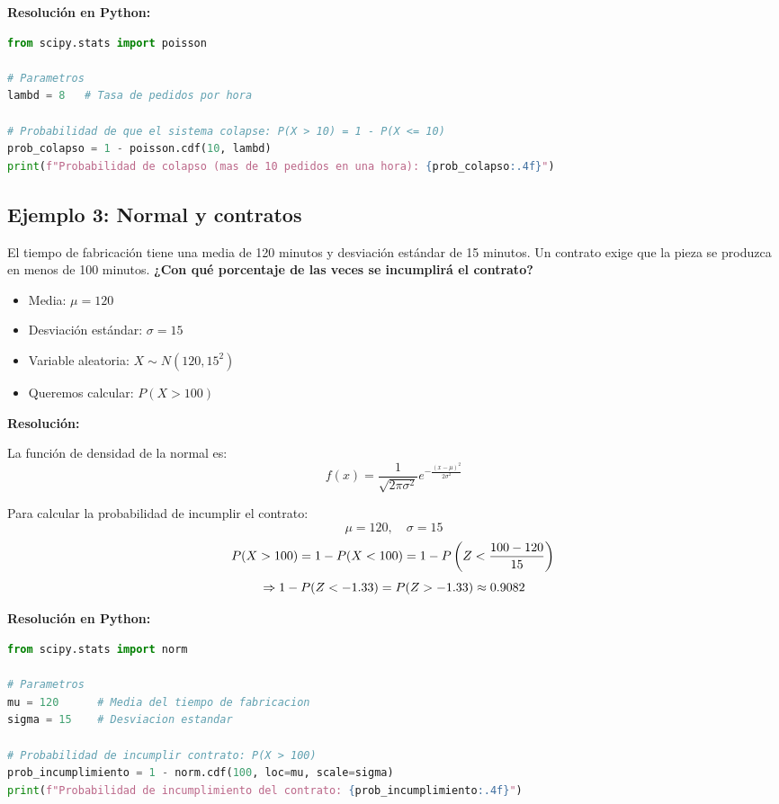 \documentclass[12pt]{article}
\begin{document}
\textbf{Resolución en Python:}

\begin{lstlisting}[language=Python]
from scipy.stats import poisson

# Parametros
lambd = 8   # Tasa de pedidos por hora

# Probabilidad de que el sistema colapse: P(X > 10) = 1 - P(X <= 10)
prob_colapso = 1 - poisson.cdf(10, lambd)
print(f"Probabilidad de colapso (mas de 10 pedidos en una hora): {prob_colapso:.4f}")
\end{lstlisting}

\subsection{Ejemplo 3: Normal y contratos}

El tiempo de fabricación tiene una media de 120 minutos y desviación estándar de 15 minutos. Un contrato exige que la pieza se produzca en menos de 100 minutos. \textbf{¿Con qué porcentaje de las veces se incumplirá el contrato?}

\begin{itemize}
    \item Media: $\mu = 120$
    \item Desviación estándar: $\sigma = 15$
    \item Variable aleatoria: $X \sim N(120, 15^2)$
    \item Queremos calcular: $P(X > 100)$
\end{itemize}

\textbf{Resolución:}

La función de densidad de la normal es:
\[
f(x) = \frac{1}{\sqrt{2\pi\sigma^2}} e^{-\frac{(x-\mu)^2}{2\sigma^2}}
\]

Para calcular la probabilidad de incumplir el contrato:
\[
\mu = 120, \quad \sigma = 15
\]
\[
P(X > 100) = 1 - P(X < 100) \\
= 1 - P\left(Z < \frac{100-120}{15}\right) \\
\]
\[
\Rightarrow 1 - P(Z < -1.33) \\
= P(Z > -1.33) \\
\approx 0.9082
\]

\textbf{Resolución en Python:}

\begin{lstlisting}[language=Python]
from scipy.stats import norm

# Parametros
mu = 120      # Media del tiempo de fabricacion
sigma = 15    # Desviacion estandar

# Probabilidad de incumplir contrato: P(X > 100)
prob_incumplimiento = 1 - norm.cdf(100, loc=mu, scale=sigma)
print(f"Probabilidad de incumplimiento del contrato: {prob_incumplimiento:.4f}")
\end{lstlisting}
\end{document}
